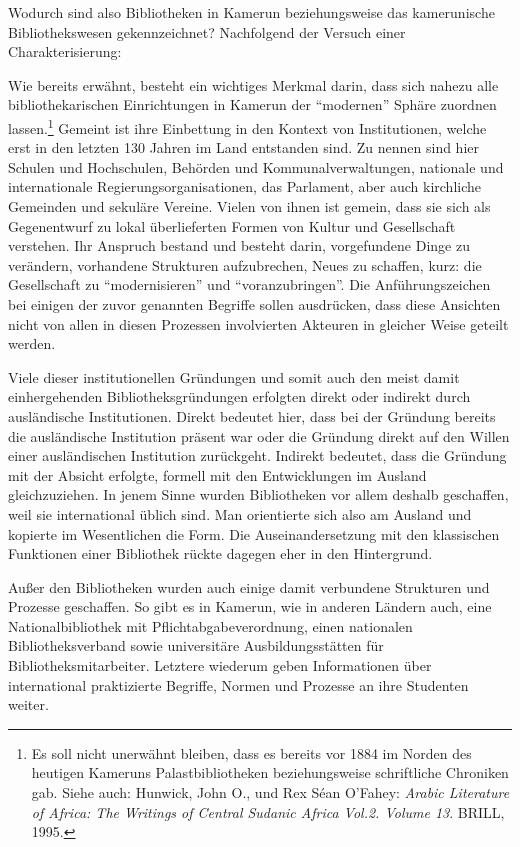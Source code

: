 \documentclass[a4paper,
fontsize=11pt,
oneside,
numbers=noperiodatend,
parskip=half-,
bibliography=totoc,
final
]{scrartcl}
\begin{document}
Wodurch sind also Bibliotheken in Kamerun beziehungsweise das
kamerunische Bibliothekswesen gekennzeichnet? Nachfolgend der Versuch
einer Charakterisierung:

Wie bereits erwähnt, besteht ein wichtiges Merkmal darin, dass sich
nahezu alle bibliothekarischen Einrichtungen in Kamerun der
\enquote{modernen} Sphäre zuordnen lassen.\footnote{Es soll nicht
  unerwähnt bleiben, dass es bereits vor 1884 im Norden des heutigen
  Kameruns Palastbibliotheken beziehungsweise schriftliche Chroniken
  gab. Siehe auch: Hunwick, John O., und Rex Séan O'Fahey: \emph{Arabic
  Literature of Africa: The Writings of Central Sudanic Africa Vol.2.
  Volume 13}. BRILL, 1995.} Gemeint ist ihre Einbettung in den Kontext
von Institutionen, welche erst in den letzten 130 Jahren im Land
entstanden sind. Zu nennen sind hier Schulen und Hochschulen, Behörden
und Kommunalverwaltungen, nationale und internationale
Regierungsorganisationen, das Parlament, aber auch kirchliche Gemeinden
und sekuläre Vereine. Vielen von ihnen ist gemein, dass sie sich als
Gegenentwurf zu lokal überlieferten Formen von Kultur und Gesellschaft
verstehen. Ihr Anspruch bestand und besteht darin, vorgefundene Dinge zu
verändern, vorhandene Strukturen aufzubrechen, Neues zu schaffen, kurz:
die Gesellschaft zu \enquote{modernisieren} und
\enquote{voranzubringen}. Die Anführungszeichen bei einigen der zuvor
genannten Begriffe sollen ausdrücken, dass diese Ansichten nicht von
allen in diesen Prozessen involvierten Akteuren in gleicher Weise
geteilt werden.

Viele dieser institutionellen Gründungen und somit auch den meist damit
einhergehenden Bibliotheksgründungen erfolgten direkt oder indirekt
durch ausländische Institutionen. Direkt bedeutet hier, dass bei der
Gründung bereits die ausländische Institution präsent war oder die
Gründung direkt auf den Willen einer ausländischen Institution
zurückgeht. Indirekt bedeutet, dass die Gründung mit der Absicht
erfolgte, formell mit den Entwicklungen im Ausland gleichzuziehen. In
jenem Sinne wurden Bibliotheken vor allem deshalb geschaffen, weil sie
international üblich sind. Man orientierte sich also am Ausland und
kopierte im Wesentlichen die Form. Die Auseinandersetzung mit den
klassischen Funktionen einer Bibliothek rückte dagegen eher in den
Hintergrund.

Außer den Bibliotheken wurden auch einige damit verbundene Strukturen
und Prozesse geschaffen. So gibt es in Kamerun, wie in anderen Ländern
auch, eine Nationalbibliothek mit Pflichtabgabeverordnung, einen
nationalen Bibliotheksverband sowie universitäre Ausbildungsstätten für
Bibliotheksmitarbeiter. Letztere wiederum geben Informationen über
international praktizierte Begriffe, Normen und Prozesse an ihre
Studenten weiter.
\end{document}
